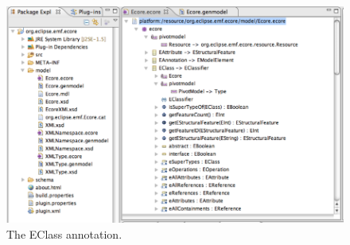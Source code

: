 \begin{figure}[!b]
	\centering
	\includegraphics[width=1.0\linewidth]{figures/pivotModelAdaption/EClassAnnotation}
	\caption{The EClass annotation.}
	\label{pic:pivotModelAdaption:EClassAnnotation}
\end{figure}


